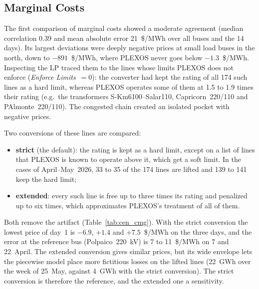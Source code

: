 \subsection{Marginal Costs}

The first comparison of marginal costs showed a moderate agreement
(median correlation 0.39 and mean absolute error 21~\$/MWh over all
buses and the 14 days).  Its largest deviations were deeply negative
prices at small load buses in the north, down to $-891$~\$/MWh, where
PLEXOS never goes below $-1.3$~\$/MWh.  Inspecting the LP traced them to
the lines whose limits PLEXOS does not enforce (\emph{Enforce
Limits}~$=0$): the converter had kept the rating of all 174 such lines
as a hard limit, whereas PLEXOS operates some of them at 1.5 to 1.9
times their rating (e.g.\ the transformers S-Km6100--Salar110,
Capricorn~220/110 and PAlmonte~220/110).  The congested chain created
an isolated pocket with negative prices.

Two conversions of these lines are compared:
\begin{itemize}
  \item \textbf{strict} (the default): the rating is kept as a hard
    limit, except on a list of lines that PLEXOS is known to operate
    above it, which get a soft limit.  In the cases of April--May~2026,
    33 to 35 of the 174 lines are lifted and 139 to 141 keep the hard
    limit;
  \item \textbf{extended}: every such line is free up to three times
    its rating and penalized up to six times, which approximates
    PLEXOS's treatment of all of them.
\end{itemize}
Both remove the artifact (Table~\ref{tab:cen_cmg}).  With the strict
conversion the lowest price of day~1 is $-6.9$, $+1.4$ and
$+7.5$~\$/MWh on the three days, and the error at the reference bus
(Polpaico~220~kV) is 7 to 11~\$/MWh on 7 and 22~April.  The extended
conversion gives similar prices, but its wide envelope lets the
piecewise model place more fictitious losses on the lifted lines
(22~GWh over the week of 25~May, against 4~GWh with the strict
conversion).  The strict conversion is therefore the reference, and the
extended one a sensitivity.

